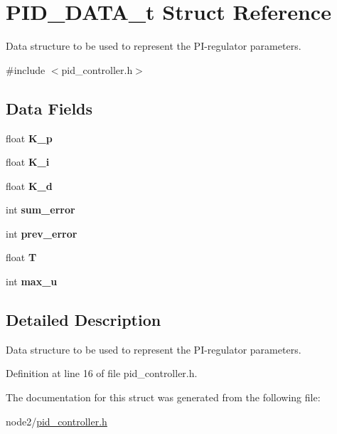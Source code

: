 \hypertarget{structPID__DATA__t}{}\section{P\+I\+D\+\_\+\+D\+A\+T\+A\+\_\+t Struct Reference}
\label{structPID__DATA__t}


Data structure to be used to represent the P\+I-\/regulator parameters.  




{\ttfamily \#include $<$pid\+\_\+controller.\+h$>$}

\subsection*{Data Fields}
\begin{DoxyCompactItemize}
\item 
\mbox{\label{structPID__DATA__t_ae58d638c14a94b246b7ff36a052c09e2}} 
float {\bfseries K\+\_\+p}
\item 
\mbox{\label{structPID__DATA__t_a8fd8444868d4d14759c3000f9bb0a02f}} 
float {\bfseries K\+\_\+i}
\item 
\mbox{\label{structPID__DATA__t_a39be860d14b5abac6c9a9b02a92ad9a6}} 
float {\bfseries K\+\_\+d}
\item 
\mbox{\label{structPID__DATA__t_a8dedd5cab17fa6e883ba9b89d0e5769c}} 
int {\bfseries sum\+\_\+error}
\item 
\mbox{\label{structPID__DATA__t_a8c0db97a2469ca5d4978203e0187fe8a}} 
int {\bfseries prev\+\_\+error}
\item 
\mbox{\label{structPID__DATA__t_a47981564b7964a0ca9d20ac022784df3}} 
float {\bfseries T}
\item 
\mbox{\label{structPID__DATA__t_aecf04009f18b7be65c1af5283a8dd5cf}} 
int {\bfseries max\+\_\+u}
\end{DoxyCompactItemize}


\subsection{Detailed Description}
Data structure to be used to represent the P\+I-\/regulator parameters. 

Definition at line 16 of file pid\+\_\+controller.\+h.



The documentation for this struct was generated from the following file\+:\begin{DoxyCompactItemize}
\item 
node2/\hyperlink{pid__controller_8h}{pid\+\_\+controller.\+h}\end{DoxyCompactItemize}
